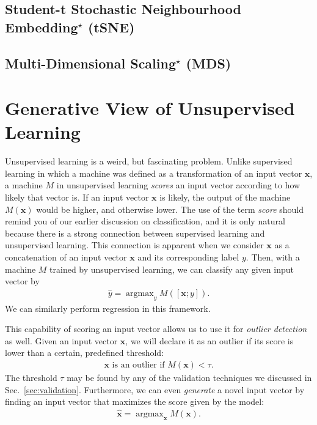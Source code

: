 \documentclass{report}
\newcommand{\vect}[1]{\mathbf{#1}}
\newcommand{\vx}[0]{\vect{x}}
\DeclareMathOperator*{\argmax}{\arg \max}
\begin{document}
\subsection{Student-t Stochastic Neighbourhood Embedding$^\star$ (tSNE)}

\subsection{Multi-Dimensional Scaling$^\star$ (MDS)}


\section{Generative View of Unsupervised Learning}

Unsupervised learning is a weird, but fascinating problem. Unlike supervised
learning in which a machine was defined as a transformation of an input vector
$\vx$, a machine $M$ in unsupervised learning {\it scores} an input vector
according to how likely that vector is. If an input vector $\vx$ is likely, the
output of the machine $M(\vx)$ would be higher, and otherwise lower. The use of
the term {\it score} should remind you of our earlier discussion on
classification, and it is only natural because there is a strong connection
between supervised learning and unsupervised learning. This connection is
apparent when we consider $\vx$ as a concatenation of an input vector $\vx$ and
its corresponding label $y$. Then, with a machine $M$ trained by unsupervised
learning, we can classify any given input vector by
\begin{align*}
    \hat{y} = \argmax_y M(\left[ \vx; y\right]).
\end{align*}
We can similarly perform regression in this framework.  

This capability of scoring an input vector allows us to use it for {\it outlier
detection} as well. Given an input vector $\vx$, we will declare it as an
outlier if its score is lower than a certain, predefined threshold:
\begin{align*}
    \vx\text{ is an outlier if }M(\vx) < \tau.
\end{align*}
The threshold $\tau$ may be found by any of the validation techniques we
discussed in Sec.~\ref{sec:validation}.  Furthermore, we can even {\it generate}
a novel input vector by finding an input vector that maximizes the score given
by the model:
\begin{align*}
    \hat{\vx} = \argmax_{\vx} M(\vx).
\end{align*}
\end{document}
